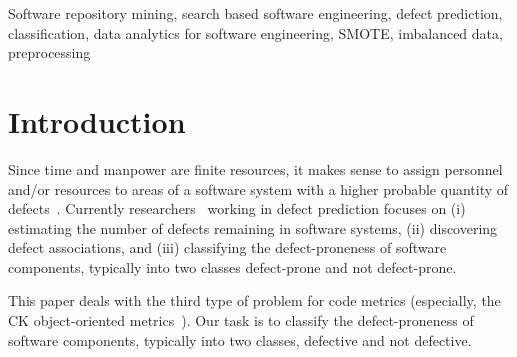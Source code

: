 \documentclass[10pt,conference]{IEEEtran}
\theoremstyle{break}
\theoremstyle{break}
\begin{document}
\begin{IEEEkeywords}
Software repository mining, 
search based software engineering,
defect prediction, classification, 
data analytics for software engineering, SMOTE,  imbalanced data, preprocessing
\end{IEEEkeywords}

\IEEEpeerreviewmaketitle






\section{Introduction}


Since time and manpower are finite resources, it
makes sense to assign personnel and/or resources to areas of
a software system with a higher probable quantity of defects~\cite{d2010extensive}. Currently researchers~\cite{song2011general} working in defect prediction focuses on (i) estimating the number of defects remaining in software systems, (ii) discovering defect associations, and (iii) classifying the defect-proneness of software components, typically into two classes defect-prone and not defect-prone. 

This paper deals with the third type of problem for code metrics (especially, the 
CK object-oriented metrics~\cite{chidamber1994metrics}).
Our task is to classify the defect-proneness of software components, typically into two classes, defective and not defective. 
\end{document}
